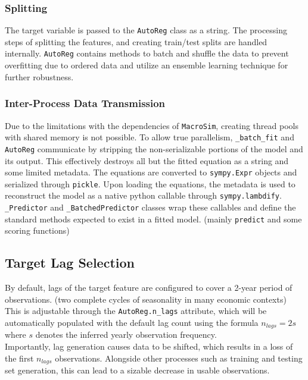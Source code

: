 \subsubsection{Splitting}
    The target variable is passed to the \texttt{AutoReg} class as a string.
    The processing steps of splitting the features, and creating train/test splits are handled internally.
    \texttt{AutoReg} contains methods to batch and shuffle the data to prevent overfitting due to ordered data and utilize an ensemble learning technique for further robustness.

\subsubsection{Inter-Process Data Transmission}
    Due to the limitations with the dependencies of \texttt{MacroSim}, creating thread pools with shared memory is not possible.
    To allow true parallelism, \texttt{\_batch\_fit} and \texttt{AutoReg} communicate by stripping the non-serializable portions of the model and its output.
    This effectively destroys all but the fitted equation as a string and some limited metadata.
    The equations are converted to \texttt{sympy.Expr} objects and serialized through \texttt{pickle}.
    Upon loading the equations, the metadata is used to reconstruct the model as a native python callable through \texttt{sympy.lambdify}.
    \\

    \texttt{\_Predictor} and \texttt{\_BatchedPredictor} classes wrap these callables and define the standard methods expected to exist in a fitted model.
    (mainly \texttt{predict} and some scoring functions)

\subsection{Target Lag Selection}\label{subsec:target-lag-selection}
    By default, lags of the target feature are configured to cover a 2-year period of observations.
    (two complete cycles of seasonality in many economic contexts)
    This is adjustable through the \texttt{AutoReg.n\_lags} attribute, which will be automatically populated with the default lag count using the formula $n_{lags}=2s$ where $s$ denotes the inferred yearly observation frequency.
    \\

    Importantly, lag generation causes data to be shifted, which results in a loss of the first $n_{lags}$ observations.
    Alongside other processes such as training and testing set generation, this can lead to a sizable decrease in usable observations.

